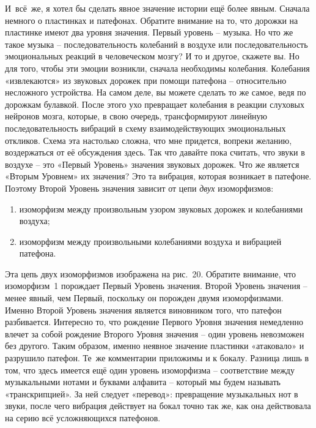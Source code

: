 \documentclass[../main.tex]{subfiles}
\begin{document}
И~всё~же, я хотел бы сделать явное значение истории ещё более явным. Сначала немного о пластинках и патефонах. Обратите внимание на то, что дорожки на пластинке имеют два уровня значения. Первый уровень \--- музыка. Но что же такое музыка \--- последовательность колебаний в воздухе или последовательность эмоциональных реакций в человеческом мозгу? И то и другое, скажете вы. Но для того, чтобы эти эмоции возникли, сначала необходимы колебания. Колебания «извлекаются» из звуковых дорожек при помощи патефона \--- относительно несложного устройства. На самом деле, вы можете сделать то же самое, ведя по дорожкам булавкой. После этого ухо превращает колебания в реакции слуховых нейронов мозга, которые, в свою очередь, трансформируют линейную последовательность вибраций в схему взаимодействующих эмоциональных откликов. Схема эта настолько сложна, что мне придется, вопреки желанию, воздержаться от её обсуждения здесь. Так что давайте пока считать, что звуки в воздухе \--- это «Первый Уровень» значения звуковых дорожек. Что же является «Вторым Уровнем» их значения? Это та вибрация, которая возникает в патефоне. Поэтому Второй Уровень значения зависит от цепи \emph{двух} изоморфизмов:
%
\begin{enumerate}[label=(\arabic*), noitemsep, topsep=6pt]
    \item изоморфизм между произвольным узором звуковых дорожек и колебаниями воздуха;
    \item изоморфизм между произвольными колебаниями воздуха и вибрацией патефона.
\end{enumerate}

Эта цепь двух изоморфизмов изображена на рис.~20. Обратите внимание, что изоморфизм~1 порождает Первый Уровень значения. Второй Уровень значения \--- менее явный, чем Первый, поскольку он порожден двумя изоморфизмами. Именно Второй Уровень значения является виновником того, что патефон разбивается. Интересно то, что рождение Первого Уровня значения немедленно влечет за собой рождение Второго Уровня значения \--- один уровень невозможен без другого. Таким образом, именно неявное значение пластинки «атаковало» и разрушило патефон. Те~же комментарии приложимы и к бокалу. Разница лишь в том, что здесь имеется ещё один уровень изоморфизма \--- соответствие между музыкальными нотами и буквами алфавита \--- который мы будем называть «транскрипцией». За ней следует «перевод»: превращение музыкальных нот в звуки, после чего вибрация действует на бокал точно так же, как она действовала на серию всё усложняющихся патефонов.
\end{document}
